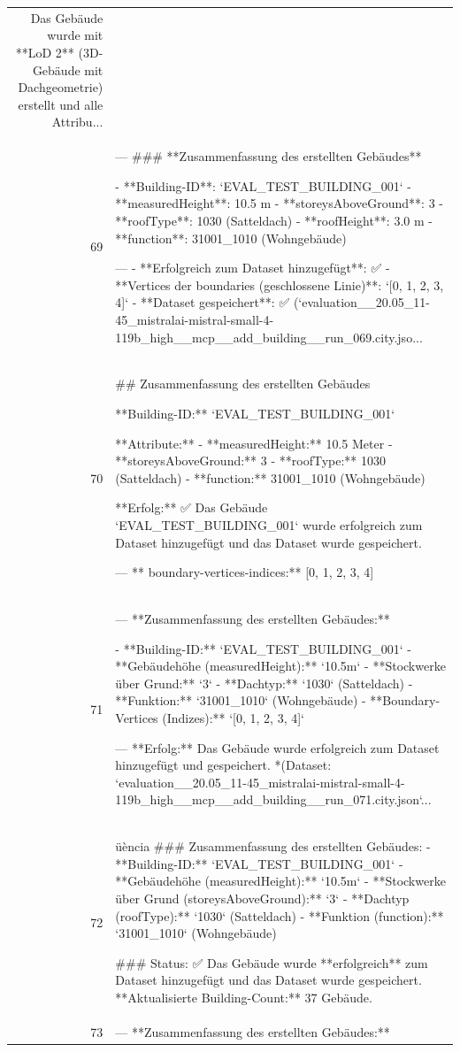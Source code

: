 \documentclass[a4paper,11pt]{article}
\begin{document}
\begin{table}[ht]
\begin{tabular}{r p{12cm}}
Das Gebäude wurde mit **LoD 2** (3D-Gebäude mit Dachgeometrie) erstellt und alle Attribu... \\
69 & ---
\#\#\# **Zusammenfassung des erstellten Gebäudes**

- **Building-ID**: `EVAL\_TEST\_BUILDING\_001`
- **measuredHeight**: 10.5 m
- **storeysAboveGround**: 3
- **roofType**: 1030 (Satteldach)
- **roofHeight**: 3.0 m
- **function**: 31001\_1010 (Wohngebäude)

---
- **Erfolgreich zum Dataset hinzugefügt**: ✅
- **Vertices der boundaries (geschlossene Linie)**: `[0, 1, 2, 3, 4]`
- **Dataset gespeichert**: ✅ (`evaluation\_\_20.05\_11-45\_mistralai-mistral-small-4-119b\_high\_\_mcp\_\_add\_building\_\_run\_069.city.jso... \\
70 & \#\# Zusammenfassung des erstellten Gebäudes

**Building-ID:** `EVAL\_TEST\_BUILDING\_001`

**Attribute:**
- **measuredHeight:** 10.5 Meter
- **storeysAboveGround:** 3
- **roofType:** 1030 (Satteldach)
- **function:** 31001\_1010 (Wohngebäude)

**Erfolg:**
✅ Das Gebäude `EVAL\_TEST\_BUILDING\_001` wurde erfolgreich zum Dataset hinzugefügt und das Dataset wurde gespeichert.

---
** boundary-vertices-indices:** [0, 1, 2, 3, 4] \\
71 & ---
**Zusammenfassung des erstellten Gebäudes:**

- **Building-ID:** `EVAL\_TEST\_BUILDING\_001`
- **Gebäudehöhe (measuredHeight):** `10.5m`
- **Stockwerke über Grund:** `3`
- **Dachtyp:** `1030` (Satteldach)
- **Funktion:** `31001\_1010` (Wohngebäude)
- **Boundary-Vertices (Indizes):** `[0, 1, 2, 3, 4]`

---
**Erfolg:** Das Gebäude wurde erfolgreich zum Dataset hinzugefügt und gespeichert.
*(Dataset: `evaluation\_\_20.05\_11-45\_mistralai-mistral-small-4-119b\_high\_\_mcp\_\_add\_building\_\_run\_071.city.json`... \\
72 & üència
\#\#\# Zusammenfassung des erstellten Gebäudes:
- **Building-ID:** `EVAL\_TEST\_BUILDING\_001`
- **Gebäudehöhe (measuredHeight):** `10.5m`
- **Stockwerke über Grund (storeysAboveGround):** `3`
- **Dachtyp (roofType):** `1030` (Satteldach)
- **Funktion (function):** `31001\_1010` (Wohngebäude)

\#\#\# Status:
✅ Das Gebäude wurde **erfolgreich** zum Dataset hinzugefügt und das Dataset wurde gespeichert.
**Aktualisierte Building-Count:** 37 Gebäude. \\
73 & ---
**Zusammenfassung des erstellten Gebäudes:**


\end{tabular}
\end{table}
\end{document}
